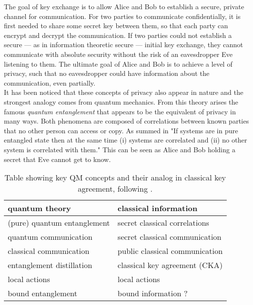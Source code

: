 

The goal of key exchange is to allow Alice and Bob to establish a secure, private channel for communication.
For two parties to communicate confidentially, it is first needed to share some secret key between them, so that each party can encrypt and decrypt the communication.
If two parties could not establish a secure --- as in information theoretic secure --- initial key exchange, they cannot communicate with absolute security without the risk of an eavesdropper Eve listening to them.
The ultimate goal of Alice and Bob is to achieve a level of privacy, such that no eavesdropper could have information about the communication, even partially.\\

It has been noticed that these concepts of privacy also appear in nature and the strongest analogy comes from quantum mechanics.\footnotemark 
From this theory arises the famous \emph{quantum entanglement} that appears to be the equivalent of privacy in many ways.
Both phenomena are composed of correlations between known parties that no other person can access or copy. As summed in \cite{4H07} "If systems are in pure entangled state then at the same time (i) systems are correlated and (ii) no other system is correlated with them."
This can be seen as Alice and Bob holding a secret that Eve cannot get to know.
\begin{table}[h]
	 \centering
	 	\begin{tabular}{ l | l}
	 		\textbf{quantum theory} & \textbf{classical information} \\ 
	 		\hline 
	 		(pure) quantum entanglement & secret classical correlations \\ 
	 		quantum communication & secret classical communication \\ 
	 		classical communication & public classical communication \\ 
	 		entanglement distillation & classical key agreement (CKA) \\ 
	 		local actions & local actions \\ 
	 		bound entanglement & bound information ? \\
	 	\end{tabular} 
	 	\caption{Table showing key QM concepts and their analog in classical key agreement, following \cite{CP02}.
	 	\label{Tab:analogy}}
	 \end{table}

